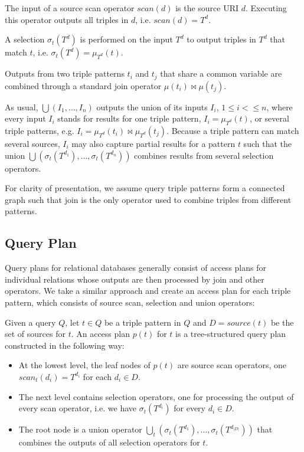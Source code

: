 \begin{definition} The input of a source scan operator $scan(d)$ is the source URI $d$.
Executing this operator outputs all triples in $d$, i.e. $scan(d) = T^d$.
\end{definition}

\begin{definition}[Selection]  A selection $\sigma_t(T^d)$ is performed on the input $T^d$ to output
triples in $T^d$ that match $t$, i.e. $\sigma_t(T^d) = \mu_{T^d}(t)$. 
\end{definition}

Outputs from two triple patterns $t_i$ and $t_j$ that share a common variable are combined through a standard join operator $\mu(t_i)\Join\mu(t_j)$. 

\begin{definition}[Union] As usual, $\bigcup(I_1,\ldots,I_n)$
outputs the union of its inputs $I_i$, $1\leq i < \leq n$, where every input $I_i$ stands for results for one triple pattern, $I_i = \mu_{T^d}(t)$, or several triple patterns, e.g. $I_i = \mu_{T^d}(t_i)\Join\mu_{T^d}(t_j)$. Because a triple pattern can match several sources, $I_i$ may also capture partial results for a pattern $t$ such that the union
$\bigcup(\sigma_t(T^{d_1}),\ldots,\sigma_t(T^{d_n}))$ combines results from several selection operators.   
\end{definition}

For clarity of presentation, we assume query triple patterns form a connected graph such that join is the only operator used to combine triples from different patterns. 


\subsection{Query Plan}
\label{sec:basicshape}
Query plans for relational databases generally consist of access plans
for individual relations whose outputs are then processed by join and
other operators. We take a similar approach and create an
access plan for each triple pattern, which consists of source scan, selection and union
operators:

\begin{definition}
  Given a query $Q$, let $t \in Q$ be a triple pattern in $Q$ and $D = source(t)$ be the set of sources for $t$. An access plan $p(t)$ for $t$ is a tree-structured query plan constructed in the
  following way:
  \begin{itemize}
  \item At the lowest level, the leaf nodes of $p(t)$ are source scan operators, one
    $scan_t(d_i) = T^{d_i}$ for each $d_i \in D$.
  \item The next level contains selection operators, one
    for processing the output of every scan operator, i.e. we have $\sigma_t(T^{d_i})$ for every $d_i \in D$.     
   \item The root node is a union operator $\bigcup_t(\sigma_t(T^{d_1}),\ldots,\sigma_t(T^{d_{|D|}}))$ that combines the outputs of all selection operators for $t$.    
  \end{itemize}
\end{definition}

